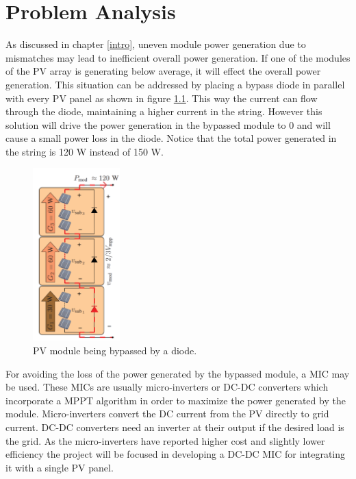 \chapter{Problem Analysis}

As discussed in chapter \ref{intro}, uneven module power generation due to mismatches may lead to inefficient overall power generation. If one of the modules of the PV array is generating below average, it will effect the overall power generation. This situation can be addressed by placing a bypass diode in parallel with every PV panel as shown in figure \ref{BYPASSED_MODULE}. This way the current can flow through the diode, maintaining a higher current in the string. However this solution will drive the power generation in the bypassed module to 0 and will cause a small power loss in the diode. Notice that the total power generated in the string is 120 W instead of 150 W.

\begin{figure}[htbp]
	\begin{center}
		\includegraphics[width=0.3\textwidth]{../Pictures/Uneven_generation}
		\caption{PV module being bypassed by a diode\cite{Architecturesconverters}.  %
		}
		\label{BYPASSED_MODULE}
	\end{center}	
\end{figure}

For avoiding the loss of the power generated by the bypassed module, a MIC may be used. %
These MICs are usually micro-inverters or DC-DC converters which incorporate a MPPT algorithm in order to maximize the power generated by the module. 
Micro-inverters convert the DC current from the PV directly to grid current. DC-DC converters need an inverter at their output if the desired load is the grid. 
As the micro-inverters have reported higher cost and slightly lower efficiency %
the project will be focused in developing a DC-DC MIC for integrating it with a single PV panel.





